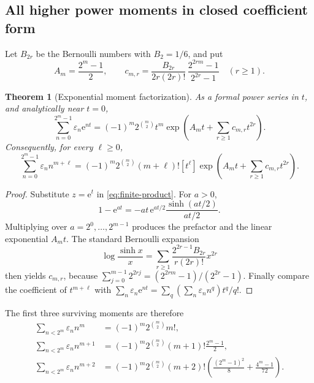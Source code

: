 \documentclass[11pt,oneside]{article}
\newtheorem{theorem}{Theorem}[section]
\theoremstyle{definition}
\theoremstyle{remark}
\newcommand{\e}{\mathrm e}
\newcommand{\eps}{\varepsilon}
\newcommand{\1}{\mathbf 1}
\begin{document}
\subsection{All higher power moments in closed coefficient form}

Let \(B_{2r}\) be the Bernoulli numbers with \(B_2=1/6\), and put
\begin{equation}
 A_m=\frac{2^m-1}{2},
 \qquad
 c_{m,r}=\frac{B_{2r}}{2r(2r)!}\,
          \frac{2^{2rm}-1}{2^{2r}-1}\quad(r\ge1).
 \label{eq:Am-cmr}
\end{equation}

\begin{theorem}[Exponential moment factorization]
\label{thm:exponential-moment}
As a formal power series in \(t\), and analytically near \(t=0\),
\begin{equation}
 \boxed{
 \sum_{n=0}^{2^m-1}\eps_n\e^{nt}
 =(-1)^m2^{\binom m2}t^m
  \exp\!\left(A_mt+\sum_{r\ge1}c_{m,r}t^{2r}\right).}
 \label{eq:exponential-factor}
\end{equation}
Consequently, for every \(\ell\ge0\),
\begin{equation}
 \boxed{
 \sum_{n=0}^{2^m-1}\eps_n n^{m+\ell}
 =(-1)^m2^{\binom m2}(m+\ell)!
 [t^\ell]\exp\!\left(A_mt+\sum_{r\ge1}c_{m,r}t^{2r}\right).}
 \label{eq:all-power-moments}
\end{equation}
\end{theorem}

\begin{proof}
Substitute \(z=\e^t\) in \eqref{eq:finite-product}.  For \(a>0\),
\[
 1-\e^{at}=-at\,\e^{at/2}\frac{\sinh(at/2)}{at/2}.
\]
Multiplying over \(a=2^0,\ldots,2^{m-1}\) produces the prefactor and the linear exponential
\(A_mt\).  The standard Bernoulli expansion
\[
 \log\frac{\sinh x}{x}
 =\sum_{r\ge1}\frac{2^{2r-1}B_{2r}}{r(2r)!}x^{2r}
\]
then yields \(c_{m,r}\), because
\(\sum_{j=0}^{m-1}2^{2rj}=(2^{2rm}-1)/(2^{2r}-1)\).  Finally compare the coefficient of
\(t^{m+\ell}\) with
\(\sum_n\eps_n\e^{nt}=\sum_q(\sum_n\eps_nn^q)t^q/q!\).
\end{proof}

The first three surviving moments are therefore
\begin{align}
 \sum_{n<2^m}\eps_nn^m
 &=(-1)^m2^{\binom m2}m!,                                  \label{eq:mom0}\\
 \sum_{n<2^m}\eps_nn^{m+1}
 &=(-1)^m2^{\binom m2}(m+1)!\frac{2^m-1}{2},               \label{eq:mom1}\\
 \sum_{n<2^m}\eps_nn^{m+2}
 &=(-1)^m2^{\binom m2}(m+2)!
   \left(\frac{(2^m-1)^2}{8}+\frac{4^m-1}{72}\right).     \label{eq:mom2}
\end{align}
\end{document}
